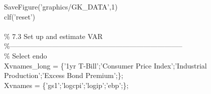\hspace{1mm}\hspace{5mm} \hspace{5mm} \hspace{5mm} \hspace{5mm} SaveFigure(\textcolor{matlabpurple}{'graphics/GK\_DATA'},1) \\ 
\hspace{1mm}\hspace{5mm} \hspace{5mm} \hspace{5mm} \hspace{5mm} clf(\textcolor{matlabpurple}{'reset'}) \\ 
\hspace{1mm}\hspace{5mm} \hspace{5mm} \hspace{5mm} \hspace{5mm}  \\ 
\hspace{1mm}\hspace{5mm} \hspace{5mm} \hspace{5mm} \hspace{5mm} \textcolor{matlabgreen}{\% 7.3 Set up and estimate VAR }\\ 
\hspace{1mm}\hspace{5mm} \hspace{5mm} \hspace{5mm} \hspace{5mm} \textcolor{matlabgreen}{\%--------------------------------------------------------------------------  }\\ 
\hspace{1mm}\hspace{5mm} \hspace{5mm} \hspace{5mm} \hspace{5mm} \textcolor{matlabgreen}{\% Select endo }\\ 
\hspace{1mm}\hspace{5mm} \hspace{5mm} \hspace{5mm} \hspace{5mm} Xvnames\_long = \{\textcolor{matlabpurple}{'1yr T-Bill'};'Consumer Price Index';'Industrial Production';'Excess Bond Premium';\}; \\ 
\hspace{1mm}\hspace{5mm} \hspace{5mm} \hspace{5mm} \hspace{5mm} Xvnames      = \{\textcolor{matlabpurple}{'gs1'};'logcpi';'logip';'ebp';\}; \\ 
